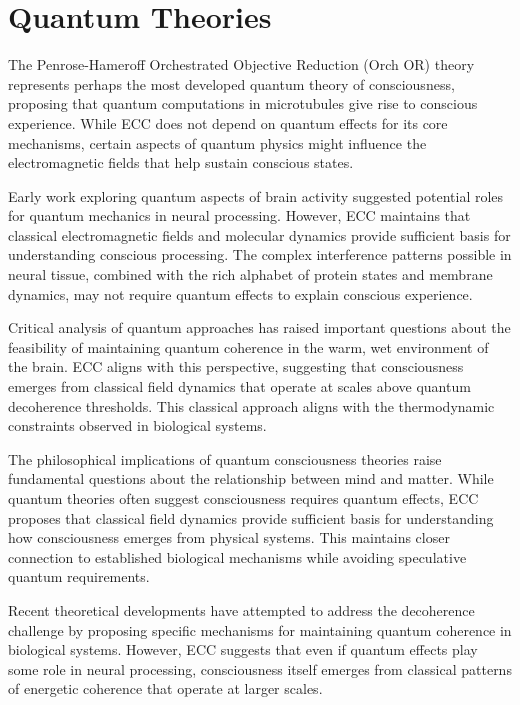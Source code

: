 \section{Quantum Theories}

The Penrose-Hameroff Orchestrated Objective Reduction (Orch OR) theory \cite{Hameroff2014} represents perhaps the most developed quantum theory of consciousness, proposing that quantum computations in microtubules give rise to conscious experience. While ECC does not depend on quantum effects for its core mechanisms, certain aspects of quantum physics might influence the electromagnetic fields that help sustain conscious states.

Early work exploring quantum aspects of brain activity \cite{Beck1992} suggested potential roles for quantum mechanics in neural processing. However, ECC maintains that classical electromagnetic fields and molecular dynamics provide sufficient basis for understanding conscious processing. The complex interference patterns possible in neural tissue, combined with the rich alphabet of protein states and membrane dynamics, may not require quantum effects to explain conscious experience.

Critical analysis of quantum approaches \cite{Tegmark2000} has raised important questions about the feasibility of maintaining quantum coherence in the warm, wet environment of the brain. ECC aligns with this perspective, suggesting that consciousness emerges from classical field dynamics that operate at scales above quantum decoherence thresholds. This classical approach aligns with the thermodynamic constraints observed in biological systems.

The philosophical implications of quantum consciousness theories \cite{Stapp2009} raise fundamental questions about the relationship between mind and matter. While quantum theories often suggest consciousness requires quantum effects, ECC proposes that classical field dynamics provide sufficient basis for understanding how consciousness emerges from physical systems. This maintains closer connection to established biological mechanisms while avoiding speculative quantum requirements.

Recent theoretical developments \cite{Hagan2002} have attempted to address the decoherence challenge by proposing specific mechanisms for maintaining quantum coherence in biological systems. However, ECC suggests that even if quantum effects play some role in neural processing, consciousness itself emerges from classical patterns of energetic coherence that operate at larger scales.

